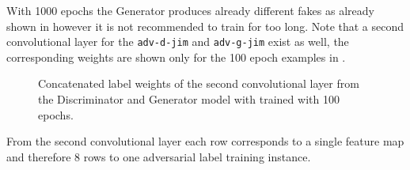 With 1000 epochs the Generator produces already different fakes as already shown in  however it is not recommended to train for too long.
Note that a second convolutional layer for the \texttt{adv-d-jim} and \texttt{adv-g-jim} exist as well, the corresponding weights are shown only for the 100 epoch examples in .
\begin{figure}[!ht]
  \centering
  \qquad \qquad
  \caption{Concatenated label weights of the second convolutional layer from the Discriminator and Generator model with trained with 100 epochs.}
  \label{fig:nn_adv_label_weights_conv1}
\end{figure}
\FloatBarrier
\noindent
From the second convolutional layer each row corresponds to a single feature map and therefore 8 rows to one adversarial label training instance.